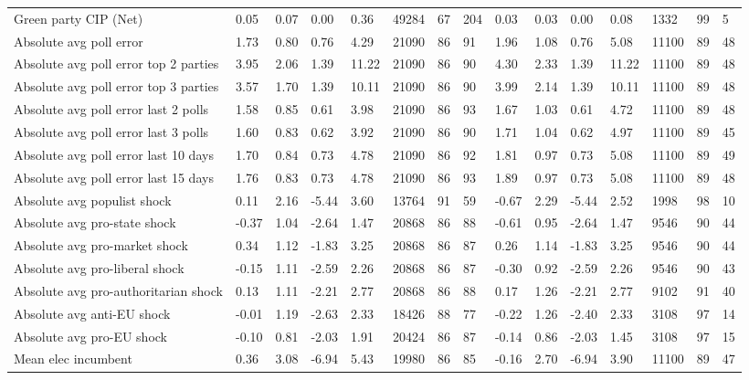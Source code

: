 \begin{longtable}{lllllllllllllll}
Green party CIP (Net) & 0.05 & 0.07 & 0.00 & 0.36 & 49284 & 67 & 204 & 0.03 & 0.03 & 0.00 & 0.08 & 1332 & 99 & 5\\
Absolute avg poll error & 1.73 & 0.80 & 0.76 & 4.29 & 21090 & 86 & 91 & 1.96 & 1.08 & 0.76 & 5.08 & 11100 & 89 & 48\\
Absolute avg poll error top 2 parties & 3.95 & 2.06 & 1.39 & 11.22 & 21090 & 86 & 90 & 4.30 & 2.33 & 1.39 & 11.22 & 11100 & 89 & 48\\
Absolute avg poll error top 3 parties & 3.57 & 1.70 & 1.39 & 10.11 & 21090 & 86 & 90 & 3.99 & 2.14 & 1.39 & 10.11 & 11100 & 89 & 48\\
Absolute avg poll error last 2 polls & 1.58 & 0.85 & 0.61 & 3.98 & 21090 & 86 & 93 & 1.67 & 1.03 & 0.61 & 4.72 & 11100 & 89 & 48\\
\addlinespace
Absolute avg poll error last 3 polls & 1.60 & 0.83 & 0.62 & 3.92 & 21090 & 86 & 90 & 1.71 & 1.04 & 0.62 & 4.97 & 11100 & 89 & 45\\
Absolute avg poll error last 10 days & 1.70 & 0.84 & 0.73 & 4.78 & 21090 & 86 & 92 & 1.81 & 0.97 & 0.73 & 5.08 & 11100 & 89 & 49\\
Absolute avg poll error last 15 days & 1.76 & 0.83 & 0.73 & 4.78 & 21090 & 86 & 93 & 1.89 & 0.97 & 0.73 & 5.08 & 11100 & 89 & 48\\
Absolute avg populist shock & 0.11 & 2.16 & -5.44 & 3.60 & 13764 & 91 & 59 & -0.67 & 2.29 & -5.44 & 2.52 & 1998 & 98 & 10\\
Absolute avg pro-state shock & -0.37 & 1.04 & -2.64 & 1.47 & 20868 & 86 & 88 & -0.61 & 0.95 & -2.64 & 1.47 & 9546 & 90 & 44\\
\addlinespace
Absolute avg pro-market shock & 0.34 & 1.12 & -1.83 & 3.25 & 20868 & 86 & 87 & 0.26 & 1.14 & -1.83 & 3.25 & 9546 & 90 & 44\\
Absolute avg pro-liberal shock & -0.15 & 1.11 & -2.59 & 2.26 & 20868 & 86 & 87 & -0.30 & 0.92 & -2.59 & 2.26 & 9546 & 90 & 43\\
Absolute avg pro-authoritarian shock & 0.13 & 1.11 & -2.21 & 2.77 & 20868 & 86 & 88 & 0.17 & 1.26 & -2.21 & 2.77 & 9102 & 91 & 40\\
Absolute avg anti-EU shock & -0.01 & 1.19 & -2.63 & 2.33 & 18426 & 88 & 77 & -0.22 & 1.26 & -2.40 & 2.33 & 3108 & 97 & 14\\
Absolute avg pro-EU shock & -0.10 & 0.81 & -2.03 & 1.91 & 20424 & 86 & 87 & -0.14 & 0.86 & -2.03 & 1.45 & 3108 & 97 & 15\\
\addlinespace
Mean elec incumbent & 0.36 & 3.08 & -6.94 & 5.43 & 19980 & 86 & 85 & -0.16 & 2.70 & -6.94 & 3.90 & 11100 & 89 & 47\\

\end{longtable}
